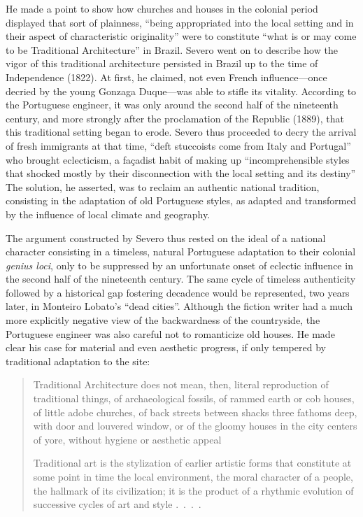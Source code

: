 He made a point to show how churches and houses in the colonial period
displayed that sort of plainness, ``being appropriated into the local
setting and in their aspect of characteristic originality'' were to
constitute ``what is or may come to be Traditional Architecture'' in
Brazil. Severo went on to describe how the vigor of this traditional
architecture persisted in Brazil up to the time of Independence (1822).
At first, he claimed, not even French influence---once decried by the
young Gonzaga Duque---was able to stifle its vitality. According to the
Portuguese engineer, it was only around the second half of the
nineteenth century, and more strongly after the proclamation of the
Republic (1889), that this traditional setting began to erode. Severo
thus proceeded to decry the arrival of fresh immigrants at that time,
``deft stuccoists come from Italy and Portugal'' who brought
eclecticism, a façadist habit of making up ``incomprehensible styles
that shocked mostly by their disconnection with the local setting and
its destiny'' \autocite[p.~415]{severo:1917arte} The solution, he
asserted, was to reclaim an authentic national tradition, consisting in
the adaptation of old Portuguese styles, as adapted and transformed by
the influence of local climate and geography.

The argument constructed by Severo thus rested on the ideal of a
national character consisting in a timeless, natural Portuguese
adaptation to their colonial \emph{genius loci}, only to be suppressed
by an unfortunate onset of eclectic influence in the second half of the
nineteenth century. The same cycle of timeless authenticity followed by
a historical gap fostering decadence would be represented, two years
later, in Monteiro Lobato's ``dead cities''. Although the fiction writer
had a much more explicitly negative view of the backwardness of the
countryside, the Portuguese engineer was also careful not to romanticize
old houses. He made clear his case for material and even aesthetic
progress, if only tempered by traditional adaptation to the site:

\begin{quote}
Traditional Architecture does not mean, then, literal reproduction of
traditional things, of archaeological fossils, of rammed earth or cob
houses, of little adobe churches, of back streets between shacks three
fathoms deep, with door and louvered window, or of the gloomy houses in
the city centers of yore, without hygiene or aesthetic appeal

Traditional art is the stylization of earlier artistic forms that
constitute at some point in time the local environment, the moral
character of a people, the hallmark of its civilization; it is the
product of a rhythmic evolution of successive cycles of art and style
.~.~.~. \autocite[p.~423--424]{severo:1917arte}
\end{quote}


